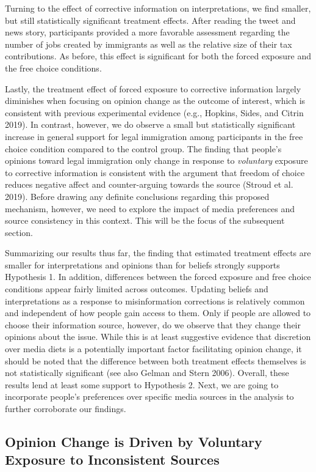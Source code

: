 \documentclass[
  12pt,
]{article}
\begin{document}
Turning to the effect of corrective information on interpretations, we
find smaller, but still statistically significant treatment effects.
After reading the tweet and news story, participants provided a more
favorable assessment regarding the number of jobs created by immigrants
as well as the relative size of their tax contributions. As before, this
effect is significant for both the forced exposure and the free choice
conditions.

Lastly, the treatment effect of forced exposure to corrective
information largely diminishes when focusing on opinion change as the
outcome of interest, which is consistent with previous experimental
evidence (e.g., Hopkins, Sides, and Citrin 2019). In contrast, however,
we do observe a small but statistically significant increase in general
support for legal immigration among participants in the free choice
condition compared to the control group. The finding that people's
opinions toward legal immigration only change in response to
\emph{voluntary} exposure to corrective information is consistent with
the argument that freedom of choice reduces negative affect and
counter-arguing towards the source (Stroud et al. 2019). Before drawing
any definite conclusions regarding this proposed mechanism, however, we
need to explore the impact of media preferences and source consistency
in this context. This will be the focus of the subsequent section.

Summarizing our results thus far, the finding that estimated treatment
effects are smaller for interpretations and opinions than for beliefs
strongly supports Hypothesis 1. In addition, differences between the
forced exposure and free choice conditions appear fairly limited across
outcomes. Updating beliefs and interpretations as a response to
misinformation corrections is relatively common and independent of how
people gain access to them. Only if people are allowed to choose their
information source, however, do we observe that they change their
opinions about the issue. While this is at least suggestive evidence
that discretion over media diets is a potentially important factor
facilitating opinion change, it should be noted that the difference
between both treatment effects themselves is not statistically
significant (see also Gelman and Stern 2006). Overall, these results
lend at least some support to Hypothesis 2. Next, we are going to
incorporate people's preferences over specific media sources in the
analysis to further corroborate our findings.

\hypertarget{opinion-change-is-driven-by-voluntary-exposure-to-inconsistent-sources}{%
\subsection{Opinion Change is Driven by Voluntary Exposure to
Inconsistent
Sources}\label{opinion-change-is-driven-by-voluntary-exposure-to-inconsistent-sources}}
\end{document}
